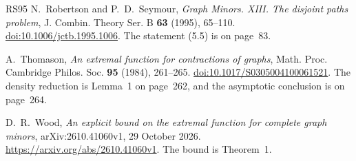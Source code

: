 \documentclass[11pt]{article}
\begin{document}
\begin{thebibliography}{RS95}
N.~Robertson and P.~D.~Seymour,
\emph{Graph Minors. XIII. The disjoint paths problem},
J. Combin. Theory Ser. B \textbf{63} (1995), 65--110.
\href{https://doi.org/10.1006/jctb.1995.1006}{doi:10.1006/jctb.1995.1006}.
The statement (5.5) is on page~83.

A.~Thomason, \emph{An extremal function for contractions of graphs},
Math. Proc. Cambridge Philos. Soc. \textbf{95} (1984), 261--265.
\href{https://doi.org/10.1017/S0305004100061521}{doi:10.1017/S0305004100061521}.
The density reduction is Lemma~1 on page~262, and the asymptotic conclusion
is on page~264.

D.~R.~Wood, \emph{An explicit bound on the extremal function for complete
graph minors}, arXiv:2610.41060v1, 29 October 2026.
\url{https://arxiv.org/abs/2610.41060v1}.
The bound is Theorem~1.
\end{thebibliography}
\end{document}
